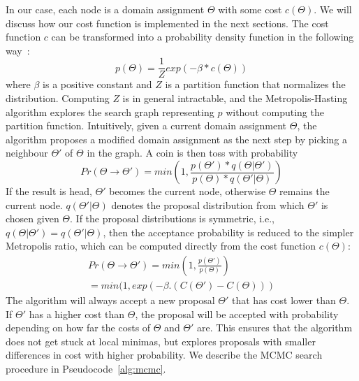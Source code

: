 In our case, each node is a domain assignment $\Theta$
with some cost $c(\Theta)$. 
We will discuss how our cost function is implemented in the next sections.
The cost function $c$ can be transformed 
into a probability density function in the following way~\cite{mcmcbook}:
\begin{equation}
	p(\Theta) = \frac{1}{Z}exp(-\beta * c(\Theta))
\end{equation}
where $\beta$ is a positive constant and $Z$ is a partition function  that
normalizes the distribution. Computing $Z$ is in general 
intractable, and the Metropolis-Hasting algorithm 
explores the search graph representing $p$ without computing the partition function. 
Intuitively, given a current domain
assignment $\Theta$, the algorithm proposes a modified 
domain assignment as the next step  by picking a neighbour
$\Theta'$ of $\Theta$ in the graph. A coin is then toss with
probability 
\begin{equation}
Pr(\Theta \rightarrow \Theta') = min(1, \frac{p(\Theta')*q(\Theta| \Theta')}{p(\Theta)*q(\Theta'| \Theta)})
\end{equation}
If the result is head, $\Theta'$
becomes the current node, otherwise $\Theta$ remains the current node.
$q(\Theta'| \Theta)$ denotes the proposal distribution from 
which $\Theta'$ is chosen given $\Theta$. If the proposal 
distributions is symmetric, i.e., 
$q(\Theta| \Theta') = q(\Theta'| \Theta)$, then the acceptance
probability is reduced to the simpler Metropolis ratio, which
can be computed directly from the cost function $c(\Theta)$:
\begin{multline}
Pr(\Theta \rightarrow \Theta') = min(1, \frac{p(\Theta')}{p(\Theta)}) \\
= min(1, exp(-\beta.(C(\Theta') - C(\Theta)))
\end{multline}
The algorithm will always accept a new proposal $\Theta'$
that has cost lower than $\Theta$. If $\Theta'$ has a 
higher cost than $\Theta$, the proposal will be 
accepted with probability depending on 
how far the costs of $\Theta$ and $\Theta'$ are. This ensures that 
the algorithm does not get stuck at local minimas, but 
explores proposals with smaller differences in cost with 
higher probability. We describe the MCMC search procedure 
in Pseudocode~\cref{alg:mcmc}. 


